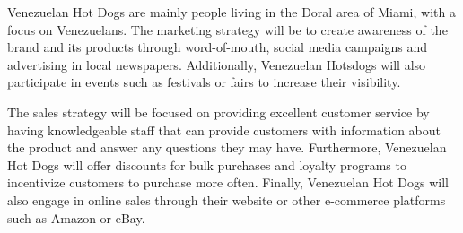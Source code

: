  Venezuelan Hot Dogs are mainly people living in the Doral area of Miami, with a focus on Venezuelans. The marketing strategy will be to create awareness of the brand and its products through word-of-mouth, social media campaigns and advertising in local newspapers. Additionally, Venezuelan Hotsdogs will also participate in events such as festivals or fairs to increase their visibility. 

The sales strategy will be focused on providing excellent customer service by having knowledgeable staff that can provide customers with information about the product and answer any questions they may have. Furthermore, Venezuelan Hot Dogs will offer discounts for bulk purchases and loyalty programs to incentivize customers to purchase more often. Finally, Venezuelan Hot Dogs will also engage in online sales through their website or other e-commerce platforms such as Amazon or eBay.